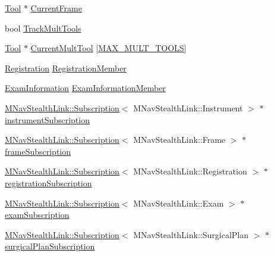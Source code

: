 \begin{DoxyCompactItemize}
\item 
\hyperlink{classmts_medtronic_stealthlink_1_1_tool}{Tool} $\ast$ \hyperlink{classmts_medtronic_stealthlink_a49aa0c7078f417253999302e19b67c8d}{Current\+Frame}
\item 
bool \hyperlink{classmts_medtronic_stealthlink_ac483f650c9ed1942194dbccca2c306d5}{Track\+Mult\+Tools}
\item 
\hyperlink{classmts_medtronic_stealthlink_1_1_tool}{Tool} $\ast$ \hyperlink{classmts_medtronic_stealthlink_a4e1f3377976ce273c64305dcfdbfe8c4}{Current\+Mult\+Tool} \mbox{[}\hyperlink{classmts_medtronic_stealthlink_a83c4c3ac445fb2dfc9b2109d169f9f60a2db20fb33f325a4d491d94d48829d57e}{M\+A\+X\+\_\+\+M\+U\+L\+T\+\_\+\+T\+O\+O\+L\+S}\mbox{]}
\item 
\hyperlink{classmts_medtronic_stealthlink_1_1_registration}{Registration} \hyperlink{classmts_medtronic_stealthlink_af3f0000b5a3e54cd33d8e133644c24eb}{Registration\+Member}
\item 
\hyperlink{classmts_medtronic_stealthlink_1_1_exam_information}{Exam\+Information} \hyperlink{classmts_medtronic_stealthlink_ab54f2ca3dd9279f65c616522695c43d3}{Exam\+Information\+Member}
\item 
\hyperlink{class_m_nav_stealth_link_1_1_subscription}{M\+Nav\+Stealth\+Link\+::\+Subscription}$<$ M\+Nav\+Stealth\+Link\+::\+Instrument $>$ $\ast$ \hyperlink{classmts_medtronic_stealthlink_a51d1dca84c09fff538413563f0bc3fd7}{instrument\+Subscription}
\item 
\hyperlink{class_m_nav_stealth_link_1_1_subscription}{M\+Nav\+Stealth\+Link\+::\+Subscription}$<$ M\+Nav\+Stealth\+Link\+::\+Frame $>$ $\ast$ \hyperlink{classmts_medtronic_stealthlink_a7498531aa89d4481e690d6a964f0de1e}{frame\+Subscription}
\item 
\hyperlink{class_m_nav_stealth_link_1_1_subscription}{M\+Nav\+Stealth\+Link\+::\+Subscription}$<$ M\+Nav\+Stealth\+Link\+::\+Registration $>$ $\ast$ \hyperlink{classmts_medtronic_stealthlink_a66aaac1496dacfa13dae52aec5b53be4}{registration\+Subscription}
\item 
\hyperlink{class_m_nav_stealth_link_1_1_subscription}{M\+Nav\+Stealth\+Link\+::\+Subscription}$<$ M\+Nav\+Stealth\+Link\+::\+Exam $>$ $\ast$ \hyperlink{classmts_medtronic_stealthlink_ae91000f8a40ee3468158a2b2bdd7ec5b}{exam\+Subscription}
\item 
\hyperlink{class_m_nav_stealth_link_1_1_subscription}{M\+Nav\+Stealth\+Link\+::\+Subscription}$<$ M\+Nav\+Stealth\+Link\+::\+Surgical\+Plan $>$ $\ast$ \hyperlink{classmts_medtronic_stealthlink_a341c6bd05bb61053f5b6ce6dde68f0b3}{surgical\+Plan\+Subscription}
\end{DoxyCompactItemize}
